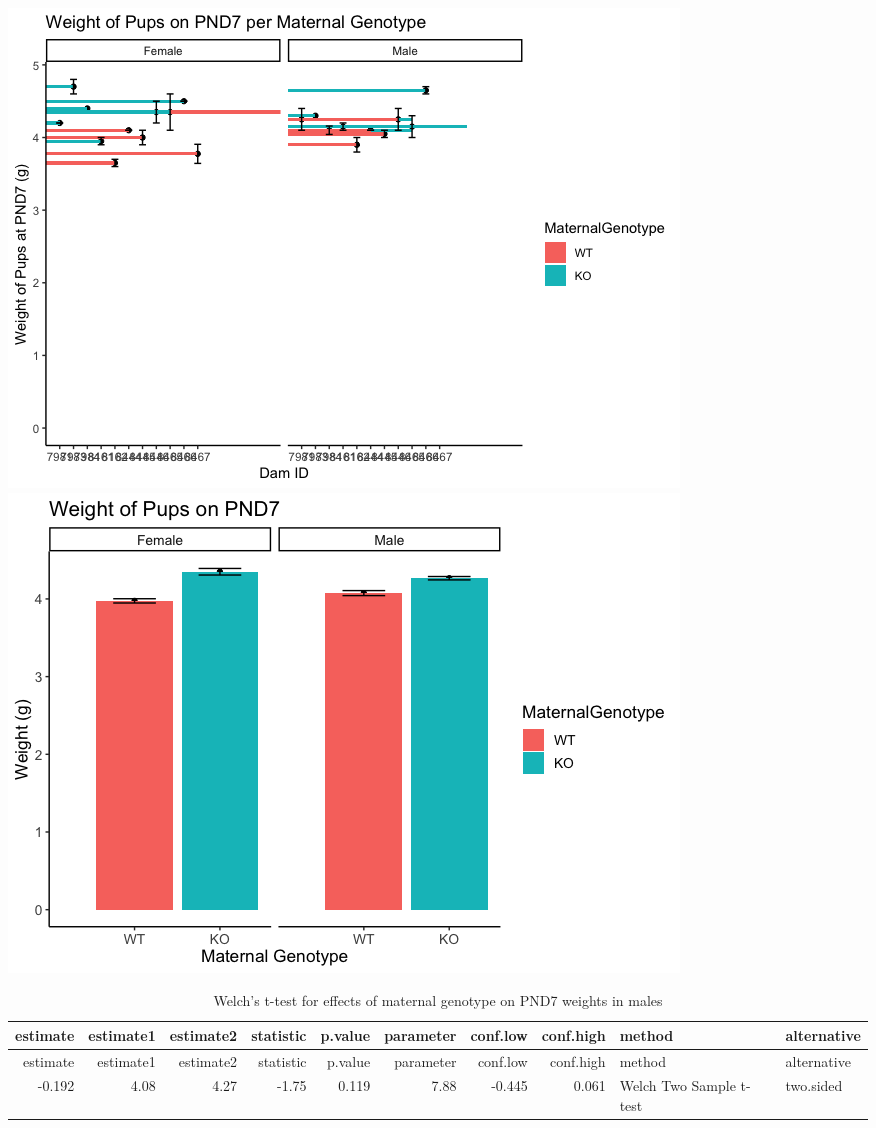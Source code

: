 \documentclass[]{article}
\begin{document}
\includegraphics{figures/PUPweight_graphsPND7-1.png}
\includegraphics{figures/PUPweight_graphsPND7-2.png}

\begin{longtable}[]{@{}rrrrrrrrll@{}}
\caption{Welch's t-test for effects of maternal genotype on PND7 weights
in males}\tabularnewline
\toprule
estimate & estimate1 & estimate2 & statistic & p.value & parameter &
conf.low & conf.high & method & alternative\tabularnewline
\midrule
\endfirsthead
\toprule
estimate & estimate1 & estimate2 & statistic & p.value & parameter &
conf.low & conf.high & method & alternative\tabularnewline
\midrule
\endhead
-0.192 & 4.08 & 4.27 & -1.75 & 0.119 & 7.88 & -0.445 & 0.061 & Welch Two
Sample t-test & two.sided\tabularnewline
\bottomrule
\end{longtable}
\end{document}
